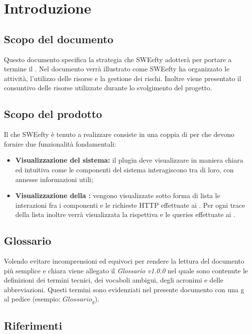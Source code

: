 
\section{Introduzione}
	\subsection{Scopo del documento}
	Questo documento specifica la strategia che SWEefty adotterà per portare a termine il .
	Nel documento verrà illustrato come SWEefty ha organizzato le attività, l'utilizzo delle risorse e la gestione dei rischi.
	Inoltre viene presentato il consuntivo delle risorse utilizzate durante lo svolgimento del progetto.
	
	\subsection{Scopo del prodotto}
Il  che SWEefty è tenuto a realizzare consiste in una coppia di  per  che devono fornire due funzionalità fondamentali:
\begin{itemize}
	\item \textbf{Visualizzazione  del sistema:} il plugin deve visualizzare in maniera chiara ed intuitiva come le componenti del sistema interagiscono tra di loro, con annesse informazioni utili;
	\item \textbf{Visualizzazione della :} vengono visualizzate sotto forma di lista le interazioni fra i componenti e le richieste HTTP effettuate ai . Per ogni trace della lista inoltre verrà visualizzata la rispettiva  e le queries effettuate ai .
\end{itemize}

\subsection{Glossario}
Volendo evitare incomprensioni  ed equivoci per rendere la lettura del documento più semplice e chiara viene allegato il \emph{Glossario v1.0.0} nel quale sono contenute le definizioni dei termini tecnici, dei vocaboli ambigui, degli acronimi e delle abbreviazioni. Questi termini sono evidenziati nel presente documento con una g al pedice (esempio: $Glossario_{g}$).
	
	\subsection{Riferimenti}
